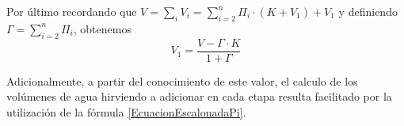 \begin{itemize}
                \par Por último recordando que $V = \sum_i V_i = \sum_{i=2}^{n} \Pi_i \cdot(K + V_1) + V_1$ y definiendo $\Gamma = \sum_{i=2}^n \Pi_i$, obtenemos
                \begin{equation}
                    V_1 = \frac{V - \Gamma \cdot K}{1 + \Gamma}
                \label{EcuacionEscalonadaGamma}
                \end{equation}
                
                \par Adicionalmente, a partir del conocimiento de este valor, el calculo de los volúmenes de agua hirviendo a adicionar en cada etapa resulta facilitado por la utilización de la fórmula \ref{EcuacionEscalonadaPi}.
            \end{itemize} %
